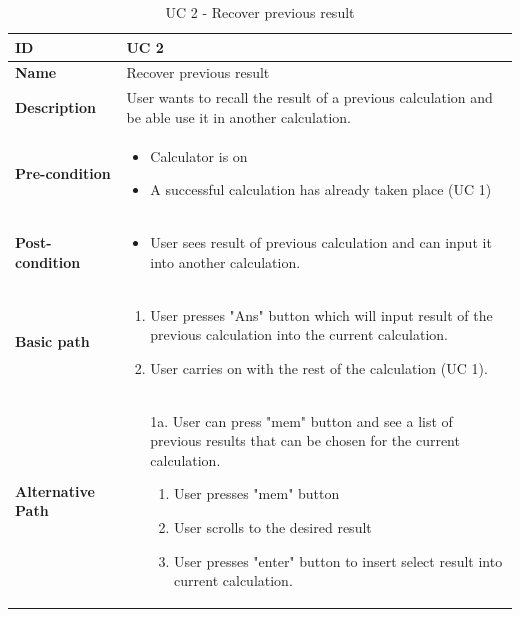 \documentclass[a4paper, 12pt]{article}
\begin{document}
\begin{table}[!h]
\begin{tabular}{|p{3cm}|p{9cm}|}
\hline
\textbf{ID} & UC 2  \\ \hline
\textbf{Name} & Recover previous result  \\ \hline
\textbf{Description} & User wants to recall the result of a previous calculation and be able use it in another calculation.  \\ \hline
\textbf{Pre-condition} &
	\begin{itemize}
		\vspace{-2mm}
		\item Calculator is on
		\item A successful calculation has already taken place (UC 1)
		\vspace{-3.5mm}
	\end{itemize}  \\ \hline
\textbf{Post-condition} &
	\begin{itemize}
		\vspace{-2mm}
		\item User sees result of previous calculation and can input it into another calculation.
		\vspace{-3.5mm}
	\end{itemize}  \\ \hline
\textbf{Basic path} &
	\begin{enumerate}
		\vspace{-2mm}
		\item User presses "Ans" button which will input result of the previous calculation into the current calculation.
		\item User carries on with the rest of the calculation (UC 1).
		\vspace{-3.5mm}
	\end{enumerate}  \\ \hline
\textbf{Alternative Path} &
	\begin{itemize}[leftmargin=6mm]
		\vspace{-2mm}
		\item [1a.] User can press "mem" button and see a list of previous results that can be chosen for the current calculation.
			\begin{enumerate}
				\item User presses "mem" button
				\item User scrolls to the desired result
				\item User presses "enter" button to insert select result into current calculation.
			\end{enumerate}
		
		\vspace{-3.5mm}
	\end{itemize}  \\ \hline
\end{tabular}
\caption{UC 2 - Recover previous result}
\end{table}
\pagebreak
\end{document}
